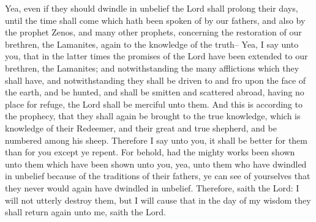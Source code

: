 Yea, even if they should dwindle in unbelief the Lord shall prolong their days, until the time shall come which hath been spoken of by our fathers, and also by the prophet Zenos, and many other prophets, concerning the restoration of our brethren, the Lamanites, again to the knowledge of the truth--
\bverse \iffalse Yea, I say unto you, that in the latter times the promises of the Lord have been extended to our brethren, the Lamanites; and notwithstanding the many afflictions which they shall have, and notwithstanding they shall be driven to and fro upon the face of the earth, and be hunted, and shall be smitten and scattered abroad, having no place for refuge, the Lord shall be merciful unto them. \fi
Yea, I say unto you, that in the latter times the promises of the Lord have been extended to our brethren, the Lamanites; and notwithstanding the many afflictions which they shall have, and notwithstanding they shall be driven to and fro upon the face of the earth, and be hunted, and shall be smitten and scattered abroad, having no place for refuge, the Lord shall be merciful unto them.
\bverse \iffalse And this is according to the prophecy, that they shall again be brought to the true knowledge, which is knowledge of their Redeemer, and their great and true shepherd, and be numbered among his sheep. \fi
And this is according to the prophecy, that they shall again be brought to the true knowledge, which is knowledge of their Redeemer, and their great and true shepherd, and be numbered among his sheep.
\bverse \iffalse Therefore I say unto you, it shall be better for them than for you except ye repent. \fi
Therefore I say unto you, it shall be better for them than for you except ye repent.
\bverse \iffalse For behold, had the mighty works been shown unto them which have been shown unto you, yea, unto them who have dwindled in unbelief because of the traditions of their fathers, ye can see of yourselves that they never would again have dwindled in unbelief. \fi
For behold, had the mighty works been shown unto them which have been shown unto you, yea, unto them who have dwindled in unbelief because of the traditions of their fathers, ye can see of yourselves that they never would again have dwindled in unbelief.
\bverse \iffalse Therefore, saith the Lord: I will not utterly destroy them, but I will cause that in the day of my wisdom they shall return again unto me, saith the Lord. \fi
Therefore, saith the Lord: I will not utterly destroy them, but I will cause that in the day of my wisdom they shall return again unto me, saith the Lord.
